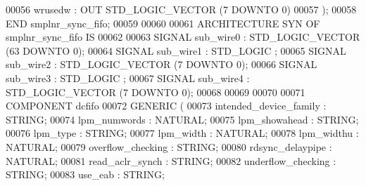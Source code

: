 \begin{DoxyCode}
{00056         \textcolor{vhdlchar}{wrusedw}     \textcolor{vhdlchar}{:} \textcolor{keywordflow}{OUT} \textcolor{comment}{STD\_LOGIC\_VECTOR} \textcolor{vhdlchar}{(}\textcolor{vhdllogic}{}\textcolor{vhdllogic}{7} \textcolor{keywordflow}{DOWNTO} \textcolor{vhdllogic}{}\textcolor{vhdllogic}{0}\textcolor{vhdlchar}{)}
00057     \textcolor{vhdlchar}{)};
00058 \textcolor{keywordflow}{END} \textcolor{vhdlchar}{smplnr\_sync\_fifo};
00059 
00060 
00061 \textcolor{keywordflow}{ARCHITECTURE} SYN \textcolor{keywordflow}{OF} smplnr_sync_fifo IS
00062 
00063     \textcolor{keywordflow}{SIGNAL} \textcolor{vhdlchar}{sub_wire0}    \textcolor{vhdlchar}{:} \textcolor{comment}{STD\_LOGIC\_VECTOR} \textcolor{vhdlchar}{(}\textcolor{vhdllogic}{}\textcolor{vhdllogic}{63} \textcolor{keywordflow}{DOWNTO} \textcolor{vhdllogic}{}\textcolor{vhdllogic}{0}\textcolor{vhdlchar}{)};
00064     \textcolor{keywordflow}{SIGNAL} \textcolor{vhdlchar}{sub_wire1}    \textcolor{vhdlchar}{:} \textcolor{comment}{STD\_LOGIC} ;
00065     \textcolor{keywordflow}{SIGNAL} \textcolor{vhdlchar}{sub_wire2}    \textcolor{vhdlchar}{:} \textcolor{comment}{STD\_LOGIC\_VECTOR} \textcolor{vhdlchar}{(}\textcolor{vhdllogic}{}\textcolor{vhdllogic}{7} \textcolor{keywordflow}{DOWNTO} \textcolor{vhdllogic}{}\textcolor{vhdllogic}{0}\textcolor{vhdlchar}{)};
00066     \textcolor{keywordflow}{SIGNAL} \textcolor{vhdlchar}{sub_wire3}    \textcolor{vhdlchar}{:} \textcolor{comment}{STD\_LOGIC} ;
00067     \textcolor{keywordflow}{SIGNAL} \textcolor{vhdlchar}{sub_wire4}    \textcolor{vhdlchar}{:} \textcolor{comment}{STD\_LOGIC\_VECTOR} \textcolor{vhdlchar}{(}\textcolor{vhdllogic}{}\textcolor{vhdllogic}{7} \textcolor{keywordflow}{DOWNTO} \textcolor{vhdllogic}{}\textcolor{vhdllogic}{0}\textcolor{vhdlchar}{)};
00068 
00069 
00070 
00071     \textcolor{keywordflow}{COMPONENT} dcfifo
00072     \textcolor{keywordflow}{GENERIC} (
00073         intended\_device\_family      : \textcolor{comment}{STRING};
00074         lpm\_numwords        : \textcolor{comment}{NATURAL};
00075         lpm\_showahead       : \textcolor{comment}{STRING};
00076         lpm\_type        : \textcolor{comment}{STRING};
00077         lpm\_width       : \textcolor{comment}{NATURAL};
00078         lpm\_widthu      : \textcolor{comment}{NATURAL};
00079         overflow\_checking       : \textcolor{comment}{STRING};
00080         rdsync\_delaypipe        : \textcolor{comment}{NATURAL};
00081         read\_aclr\_synch     : \textcolor{comment}{STRING};
00082         underflow\_checking      : \textcolor{comment}{STRING};
00083         use\_eab     : \textcolor{comment}{STRING};
}
\end{DoxyCode}
